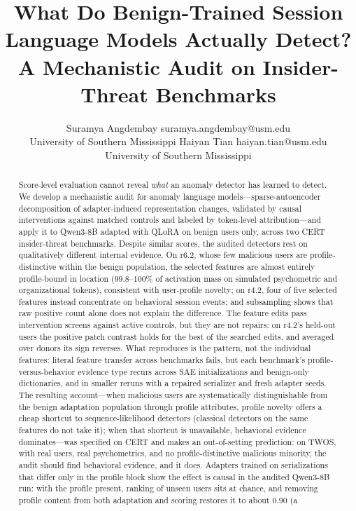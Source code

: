 \documentclass[10pt]{article} %
\title{What Do Benign-Trained Session Language Models Actually Detect? \\ A Mechanistic Audit on Insider-Threat Benchmarks}
\author{\name Suramya Angdembay \email suramya.angdembay@usm.edu \\
\addr University of Southern Mississippi
\AND
\name Haiyan Tian \email haiyan.tian@usm.edu \\
\addr University of Southern Mississippi}
\newcommand{\rsix}{r6.2}
\newcommand{\rfour}{r4.2}
\begin{document}
\maketitle

\begin{abstract}
Score-level evaluation cannot reveal \emph{what} an anomaly detector has
learned to detect. We develop a mechanistic audit for anomaly language
models---sparse-autoencoder decomposition of adapter-induced
representation changes, validated by causal interventions against matched
controls and labeled by token-level attribution---and apply it to
Qwen3-8B adapted with QLoRA on benign users only, across two CERT
insider-threat benchmarks. Despite similar scores, the audited detectors
rest on qualitatively different internal evidence. On \rsix{}, whose few
malicious users are profile-distinctive within the benign population, the
selected features are almost entirely profile-bound in location
($99.8$--$100\%$ of activation mass on simulated psychometric and
organizational tokens), consistent with user-profile novelty; on
\rfour{}, four of five selected features instead concentrate on
behavioral session events; and subsampling shows that raw positive count
alone does not explain the difference. The feature edits pass intervention
screens against active controls, but they are not repairs: on \rfour{}'s
held-out users the positive patch contrast holds for the best of the searched
edits, and averaged over donors its sign reverses. What reproduces is the pattern,
not the individual features: literal feature transfer across benchmarks
fails, but each benchmark's profile-versus-behavior evidence type recurs
across SAE initializations and benign-only dictionaries, and in smaller
reruns with a repaired serializer and fresh adapter seeds. The resulting
account---when malicious users are systematically distinguishable from
the benign adaptation population through profile attributes, profile
novelty offers a cheap shortcut to sequence-likelihood detectors
(classical detectors on the same features do not take it); when that
shortcut is
unavailable, behavioral evidence dominates---was specified on CERT and
makes an out-of-setting prediction: on TWOS, with real users, real
psychometrics, and no profile-distinctive malicious minority, the audit
should find behavioral evidence, and it does. Adapters trained on serializations that differ only in the profile block
show the effect is causal in the audited Qwen3-8B run: with the profile
present, ranking of unseen users sits at chance, and removing profile
content from both adaptation and scoring restores it to about $0.90$ (a

\end{abstract}
\end{document}
